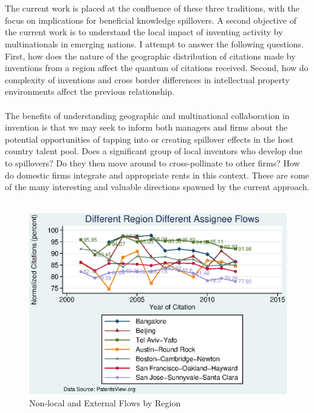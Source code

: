 \documentclass[12pt]{article}
\begin{document}
\\\\
The current work is placed at the confluence of these three traditions, with the focus on implications for beneficial knowledge spillovers. A second objective of the current work is to understand the local impact of inventing activity by multinationals in emerging nations. I attempt to answer the following questions. First, how does the nature of the geographic distribution of citations made by inventions from a region affect the quantum of citations received. Second, how do complexity of inventions and cross border differences in intellectual property environments affect the previous relationship. 
\\\\
The benefits of understanding geographic and multinational collaboration in invention is that we may seek to inform both managers and firms about the potential opportunities of tapping into or creating spillover effects in the host country talent pool. Does a significant group of local inventors who develop due to spillovers? Do they then move around to cross-pollinate to other firms? How do domestic firms integrate and appropriate rents in this context. These are some of the many interesting and valuable directions spawned by the current approach. 
\\\\


\begin{figure}[h]
\begin{centering}
  \includegraphics[width=\textwidth]{DiffRegionDiffAssigneeFlows}
  \caption{Non-local and External Flows by Region}
  \label{fig:DiffRegionDiffAssigneeFlows}
\end{centering}
\end{figure}
\end{document}
